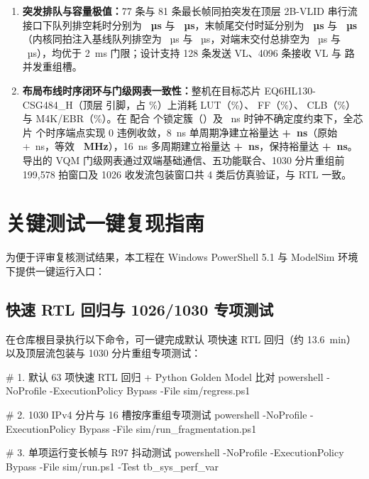 \begin{enumerate}
  \item \textbf{突发排队与容量极值：}77 条与 81 条最长帧同拍突发在顶层 2B-VLID 串行流接口下队列排空耗时分别为 \textbf{\BurstSevSeven~µs} 与 \textbf{\BurstEightOne~µs}，末帧尾交付时延分别为 \textbf{\BurstSevSevenTail~µs} 与 \textbf{\BurstEightOneTail~µs}（内核同拍注入基线队列排空为 \BurstSevSevenBase~µs 与 \BurstEightOneBase~µs，对端末交付总排空为 \BurstSevSevenLast~µs 与 \BurstEightOneLast~µs），均优于 2~ms 门限；设计支持 128 条发送 VL、4096 条接收 VL 与 \ReasmContexts{} 路并发重组槽。
  \item \textbf{布局布线时序闭环与门级网表一致性：}整机在目标芯片 EQ6HL130-CSG484\_H（顶层 \Pins{} 引脚，占 \PinPct\%）上消耗 \Lut{} LUT（\LutPct\%）、\FF{} FF（\FFPct\%）、\Clb{} CLB（\ClbPct\%）与 \Mem{} M4K/EBR（\MemPct\%）。在  配合 \countsep{\LockedClusters} 个锁定簇（）及 \ClkUncert~ns 时钟不确定度约束下，全芯片 \countsep{\RoutedEndpoints} 个时序端点实现 0 违例收敛，8~ns 单周期净建立裕量达 \textbf{+\RoutedSetup~ns}（原始 +\RoutedSetupRaw~ns，等效 \textbf{\RoutedFmax~MHz}），16~ns 多周期建立裕量达 \textbf{+\MulticycleSetup~ns}，保持裕量达 \textbf{+\RoutedHold~ns}。导出的 VQM 门级网表通过双端基础通信、五功能联合、1030 分片重组前 199,578 拍窗口及 1026 收发流包装窗口共 4 类后仿真验证，与 RTL 一致。
\end{enumerate}

\section{关键测试一键复现指南}

为便于评审复核测试结果，本工程在 Windows PowerShell 5.1 与 ModelSim 环境下提供一键运行入口：

\subsection{快速 RTL 回归与 1026/1030 专项测试}
在仓库根目录执行以下命令，可一键完成默认 \RegFastCount{} 项快速 RTL 回归（约 13.6~min）以及顶层流包装与 1030 分片重组专项测试：
\begin{runcommand}
# 1. 默认 63 项快速 RTL 回归 + Python Golden Model 比对
powershell -NoProfile -ExecutionPolicy Bypass -File sim/regress.ps1

# 2. 1030 IPv4 分片与 16 槽按序重组专项测试
powershell -NoProfile -ExecutionPolicy Bypass -File sim/run_fragmentation.ps1

# 3. 单项运行变长帧与 R97 抖动测试
powershell -NoProfile -ExecutionPolicy Bypass -File sim/run.ps1 -Test tb_sys_perf_var
\end{runcommand}

